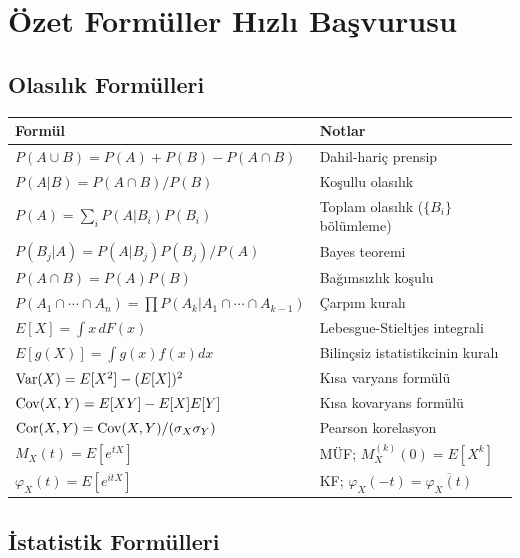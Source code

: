 \section{Özet Formüller Hızlı Başvurusu}
\label{app:hizli_formul}

\subsection{Olasılık Formülleri}

\begin{center}
\renewcommand{\arraystretch}{1.5}
\small
\begin{tabular}{p{5cm}p{7cm}}
\hline
\textbf{Formül} & \textbf{Notlar} \\
\hline
$P(A\cup B)=P(A)+P(B)-P(A\cap B)$ & Dahil-hariç prensip \\
$P(A|B)=P(A\cap B)/P(B)$ & Koşullu olasılık \\
$P(A)=\sum_i P(A|B_i)P(B_i)$ & Toplam olasılık ($\{B_i\}$ bölümleme) \\
$P(B_j|A)=P(A|B_j)P(B_j)/P(A)$ & Bayes teoremi \\
$P(A\cap B)=P(A)P(B)$ & Bağımsızlık koşulu \\
$P(A_1\cap\cdots\cap A_n)=\prod P(A_k|A_1\cap\cdots\cap A_{k-1})$ & Çarpım kuralı \\
$E[X]=\int x\,dF(x)$ & Lebesgue-Stieltjes integrali \\
$E[g(X)]=\int g(x)f(x)dx$ & Bilinçsiz istatistikcinin kuralı \\
$\operatorname{Var}(X)=E[X^2]-(E[X])^2$ & Kısa varyans formülü \\
$\operatorname{Cov}(X,Y)=E[XY]-E[X]E[Y]$ & Kısa kovaryans formülü \\
$\operatorname{Cor}(X,Y)=\operatorname{Cov}(X,Y)/(\sigma_X\sigma_Y)$ & Pearson korelasyon \\
$M_X(t)=E[e^{tX}]$ & MÜF; $M_X^{(k)}(0)=E[X^k]$ \\
$\varphi_X(t)=E[e^{itX}]$ & KF; $\varphi_X(-t)=\overline{\varphi_X(t)}$ \\
\hline
\end{tabular}
\end{center}

\subsection{İstatistik Formülleri}

